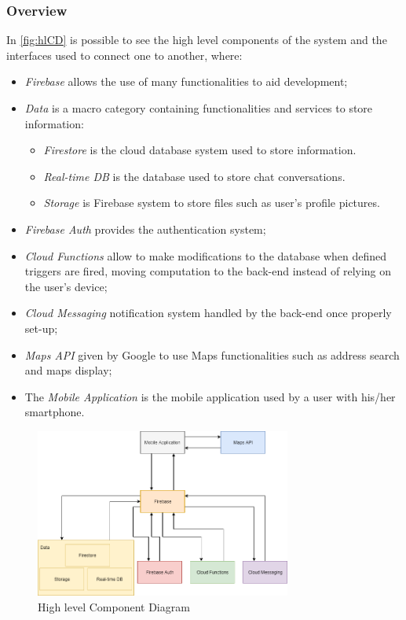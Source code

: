 \subsubsection{Overview}
In \autoref{fig:hlCD} is possible to see the high level components of the system and the interfaces used to connect one to another, where:
\begin{itemize}
\item \emph{Firebase} allows the use of many functionalities to aid development;
\item \emph{Data} is a macro category containing functionalities and services to store information:
\begin{itemize}
\item \emph{Firestore} is the cloud database system used to store information.
\item \emph{Real-time DB} is the database used to store chat conversations.
\item \emph{Storage} is Firebase system to store files such as user's profile pictures.
\end{itemize}
\item \emph{Firebase Auth} provides the authentication system;
\item \emph{Cloud Functions} allow to make modifications to the database when defined triggers are fired, moving computation to the back-end instead of relying on the user's device;
\item \emph{Cloud Messaging} notification system handled by the back-end once properly set-up;
\item \emph{Maps API} given by Google to use Maps functionalities such as address search and maps display;
\item The \emph{Mobile Application} is the mobile application used by a user with his/her smartphone.
\end{itemize}
\begin{figure}[H]
\centering
	\includegraphics[width = 0.75\textwidth, keepaspectratio = true]{Img/HighLevelComponent}
	\caption{High level Component Diagram}
	\label{fig:hlCD}
\end{figure}
\clearpage
